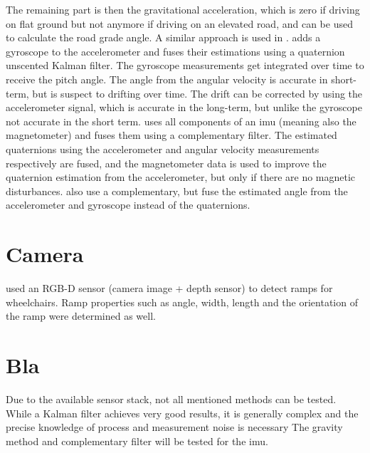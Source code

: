 The remaining part is then the gravitational acceleration, which is zero if driving on flat ground but not anymore if driving on an elevated road, and can be used to calculate the road grade angle.
A similar approach is used in \cite{Sentouh2008}.
\cite{He2020} adds a gyroscope to the accelerometer and fuses their estimations using a quaternion unscented Kalman filter.
The gyroscope measurements get integrated over time to receive the pitch angle.
The angle from the angular velocity is accurate in short-term, but is suspect to drifting over time.
The drift can be corrected by using the accelerometer signal, which is accurate in the long-term, but unlike the gyroscope not accurate in the short term.
\cite{Wu2016} uses all components of an \gls{imu} (meaning also the magnetometer) and fuses them using a complementary filter.
The estimated quaternions using the accelerometer and angular velocity measurements respectively are fused, and the magnetometer data is used to improve the quaternion estimation from the accelerometer, but only if there are no magnetic disturbances.
\cite{Euston2008,Jauch2018} also use a complementary, but fuse the estimated angle from the accelerometer and gyroscope instead of the quaternions.



\section{}



\section{Camera}
\cite{Nejati2016} used an RGB-D sensor (camera image + depth sensor) to detect ramps for wheelchairs.
Ramp properties such as angle, width, length and the orientation of the ramp were determined as well.



\section{Bla}
Due to the available sensor stack, not all mentioned methods can be tested.
While a Kalman filter achieves very good results, it is generally complex and the precise knowledge of process and measurement noise is necessary \cite{Higgins1975}
The gravity method and complementary filter will be tested for the \gls{imu}.


